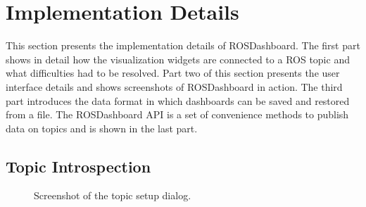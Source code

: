 


\section{Implementation Details}
This section presents the implementation details of ROSDashboard. The first part shows in detail how the visualization widgets are connected to a ROS topic and what difficulties had to be resolved. Part two of this section presents the user interface details and shows screenshots of ROSDashboard in action. The third part introduces the data format in which dashboards can be saved and restored from a file. The ROSDashboard API is a set of convenience methods to publish data on topics and is shown in the last part.

\subsection{Topic Introspection}

\begin{figure}[thpb]
  \centering
  \caption{Screenshot of the topic setup dialog.}
  \label{topic setup screenshot}
\end{figure}

